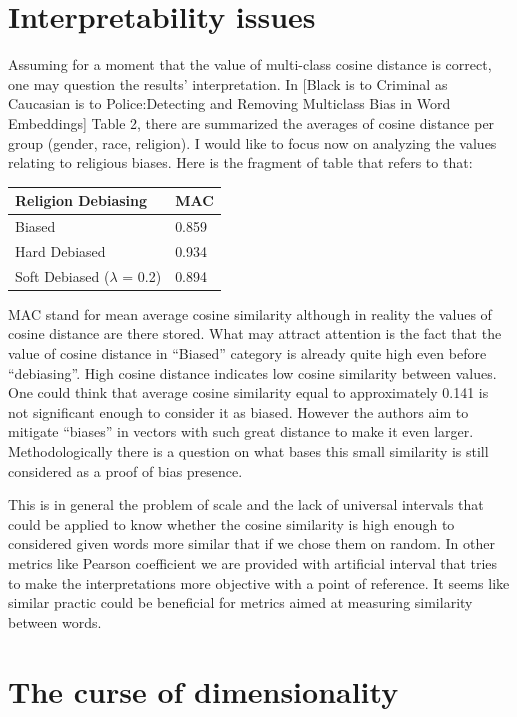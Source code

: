 \documentclass[12pt,]{book}
\begin{document}
\section{Interpretability issues}\label{interpretability-issues}

Assuming for a moment that the value of multi-class cosine distance is
correct, one may question the results' interpretation. In {[}Black is to
Criminal as Caucasian is to Police:Detecting and Removing Multiclass
Bias in Word Embeddings{]} Table 2, there are summarized the averages of
cosine distance per group (gender, race, religion). I would like to
focus now on analyzing the values relating to religious biases. Here is
the fragment of table that refers to that:

\begin{longtable}[]{@{}ll@{}}
\toprule
Religion Debiasing & MAC\tabularnewline
\midrule
\endhead
Biased & 0.859\tabularnewline
Hard Debiased & 0.934\tabularnewline
Soft Debiased (\(\lambda\) = 0.2) & 0.894\tabularnewline
\bottomrule
\end{longtable}

MAC stand for mean average cosine similarity although in reality the
values of cosine distance are there stored. What may attract attention
is the fact that the value of cosine distance in ``Biased'' category is
already quite high even before ``debiasing''. High cosine distance
indicates low cosine similarity between values. One could think that
average cosine similarity equal to approximately 0.141 is not
significant enough to consider it as biased. However the authors aim to
mitigate ``biases'' in vectors with such great distance to make it even
larger. Methodologically there is a question on what bases this small
similarity is still considered as a proof of bias presence.

This is in general the problem of scale and the lack of universal
intervals that could be applied to know whether the cosine similarity is
high enough to considered given words more similar that if we chose them
on random. In other metrics like Pearson coefficient we are provided
with artificial interval that tries to make the interpretations more
objective with a point of reference. It seems like similar practic could
be beneficial for metrics aimed at measuring similarity between words.

\section{The curse of dimensionality}\label{the-curse-of-dimensionality}
\end{document}
